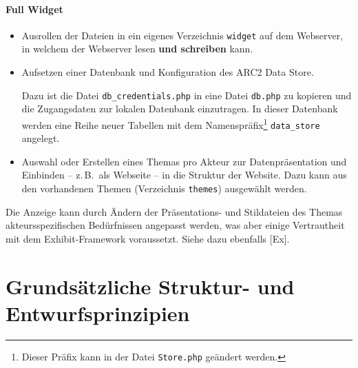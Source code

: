\documentclass[11pt,a4paper]{article}
\begin{document}
\paragraph{Full Widget}
\begin{itemize}
\item Ausrollen der Dateien in ein eigenes Verzeichnis \texttt{widget} auf dem
  Webserver, in welchem der Webserver lesen \textbf{und schreiben} kann.
\item Aufsetzen einer Datenbank und Konfiguration des ARC2 Data Store.

  Dazu ist die Datei \texttt{db\_credentials.php} in eine Datei
  \texttt{db.php} zu kopieren und die Zugangsdaten zur lokalen Datenbank
  einzutragen. In dieser Datenbank werden eine Reihe neuer Tabellen mit dem
  Namenspräfix\footnote{Dieser Präfix kann in der Datei \texttt{Store.php}
    geändert werden.} \texttt{data\_store} angelegt.
\item Auswahl oder Erstellen eines Themas pro Akteur zur Datenpräsentation und
  Einbinden -- z.\,B.\ als Webseite -- in die Struktur der Website.  Dazu kann
  aus den vorhandenen Themen (Verzeichnis \texttt{themes}) ausgewählt werden.
\end{itemize}
Die Anzeige kann durch Ändern der Präsentations- und Stildateien des Themas
akteurs\-spezifischen Bedürfnissen angepasst werden, was aber einige
Vertrautheit mit dem Exhibit-Framework voraussetzt.  Siehe dazu ebenfalls
[Ex].

\section{Grundsätzliche Struktur- und Entwurfsprinzipien}
\end{document}
